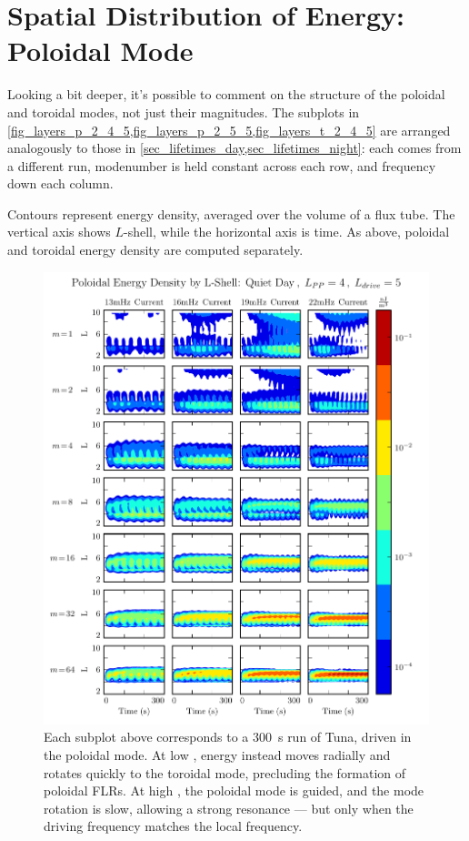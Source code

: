 \section{Spatial Distribution of Energy: Poloidal Mode}
  \label{sec_layers_p}

Looking a bit deeper, it's possible to comment on the structure of the poloidal and toroidal modes, not just their magnitudes. The subplots in \cref{fig_layers_p_2_4_5,fig_layers_p_2_5_5,fig_layers_t_2_4_5} are arranged analogously to those in \cref{sec_lifetimes_day,sec_lifetimes_night}: each comes from a different run, modenumber is held constant across each row, and frequency down each column. 

Contours represent energy density, averaged over the volume of a flux tube. The vertical axis shows $L$-shell, while the horizontal axis is time. As above, poloidal and toroidal energy density are computed separately. 

\begin{figure}[!htb]
    \centering
    \includegraphics[width=\textwidth]{figures/layers_p_2_4_5.pdf}
    \caption[Radial Distribution of Poloidal Energy: Quiet Day, Typical Plasmasphere]{
      Each subplot above corresponds to a \SI{300}{\s} run of Tuna, driven in the poloidal mode. At low \azm, energy instead moves radially and rotates quickly to the toroidal mode, precluding the formation of poloidal FLRs. At high \azm, the poloidal mode is guided, and the mode rotation is slow, allowing a strong resonance --- but only when the driving frequency matches the local \Alfven frequency. 
    }
    \label{fig_layers_p_2_4_5}
\end{figure}

